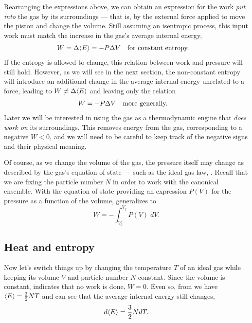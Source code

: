 Rearranging the expressions above, we can obtain an expression for the work \textit{put into} the gas by its surroundings --- that is, by the external force applied to move the piston and change the volume.
Still assuming an isentropic process, this input work must match the increase in the gas's average internal energy,
\begin{align*}
  W & = \Delta\!\left\langle E \right\rangle = -P \Delta V & & \mbox{for constant entropy.}
\end{align*}
If the entropy is allowed to change, this relation between work and pressure will still hold.
However, as we will see in the next section, the non-constant entropy will introduce an additional change in the average internal energy unrelated to a force, leading to $W \neq \Delta\!\left\langle E \right\rangle$ and leaving only the relation
\begin{align}
  \label{eq:work_constP}
  W & = -P \Delta V & & \mbox{more generally.}
\end{align}
Later we will be interested in using the gas as a thermodynamic engine that \textit{does work on} its surroundings.
This removes energy from the gas, corresponding to a negative $W < 0$, and we will need to be careful to keep track of the negative signs and their physical meaning.

Of course, as we change the volume of the gas, the pressure itself may change as described by the gas's equation of state --- such as the ideal gas law, .
Recall that we are fixing the particle number $N$ in order to work with the canonical ensemble.
With the equation of state providing an expression $P(V)$ for the pressure as a function of the volume,  generalizes to
\begin{equation}
  \label{eq:work}
  W = -\int_{V_0}^{V_f} P(V) \; dV.
\end{equation}



\subsection{Heat and entropy}
Now let's switch things up by changing the temperature $T$ of an ideal gas while keeping its volume $V$ and particle number $N$ constant.
Since the volume is constant,  indicates that no work is done, $W = 0$.
Even so, from  we have $\left\langle E \right\rangle = \frac{3}{2} NT$ and can see that the average internal energy still changes,
\begin{equation}
  \label{eq:dE_dT}
  d\!\left\langle E \right\rangle = \frac{3}{2} N dT.
\end{equation}

